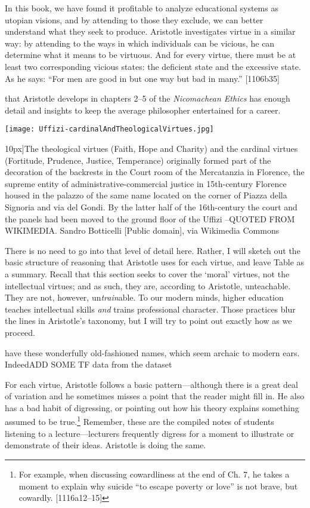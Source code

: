 In this book, we have found it profitable to analyze educational systems as utopian visions, and by attending to those they exclude, we can better understand what they seek to produce. Aristotle investigates virtue in a similar way: by attending to the ways in which individuals can be vicious, he can determine what it means to be virtuous. And for every virtue, there must be at least two corresponding vicious states: the deficient state and the excessive state. As he says: ``For men are good in but one way but bad in many.'' [1106b35]

 that Aristotle develops in chapters 2--5 of the \emph{Nicomachean Ethics} has enough detail and insights to keep the average philosopher entertained for a career. 

\begin{figure*}\texttt{[image: Uffizi-cardinalAndTheologicalVirtues.jpg]}
\caption[The seven virtues of catholicism][10px]{The theological virtues (Faith, Hope and Charity) and the cardinal virtues (Fortitude, Prudence, Justice, Temperance) originally formed part of the decoration of the backrests in the Court room of the Mercatanzia in Florence, the supreme entity of administrative-commercial justice in 15th-century Florence housed in the palazzo of the same name located on the corner of Piazza della Signoria and via del Gondi. By the latter half of the 16th-century the court and the panels had been moved to the ground floor of the Uffizi --QUOTED FROM WIKIMEDIA. Sandro Botticelli [Public domain], via Wikimedia Commons}
\end{figure*}

There is no need to go into that level of detail here. Rather, I will sketch out the basic structure of reasoning that Aristotle uses for each virtue, and leave Table  as a summary. Recall that this section seeks to cover the `moral' virtues, not the intellectual virtues; and as such, they are, according to Aristotle, unteachable. They are not, however, un\emph{train}able. To our modern minds, higher education teaches intellectual skills \emph{and} trains professional character. Those practices blur the lines in Aristotle's taxonomy, but I will try to point out exactly how as we proceed.

 have these wonderfully old-fashioned names, which seem archaic to modern ears. IndeedADD SOME TF data from the dataset

For each virtue, Aristotle follows a basic pattern---although there is a great deal of variation and he sometimes misses a point that the reader might fill in. He also has a bad habit of digressing, or pointing out how his theory explains something assumed to be true.\footnote{For example, when discussing cowardliness at the end of Ch. 7, he takes a moment to explain why suicide ``to escape poverty or love'' is not brave, but cowardly. [1116a12--15]} Remember, these are the compiled notes of students listening to a lecture---lecturers frequently digress for a moment to illustrate or demonstrate of their ideas. Aristotle is doing the same.

